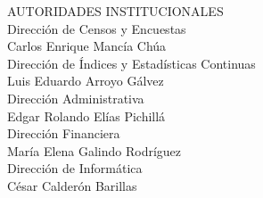 \clearpage

$\ $
\vspace{1cm}

\begin{center}
{\Bold \LARGE AUTORIDADES INSTITUCIONALES}\\[2cm]

{\Bold \large \color{color1!89!black} Dirección de Censos y Encuestas}\\[0.2cm]
Carlos Enrique Mancía Chúa\\[0.8cm]


{\Bold \large \color{color1!89!black} Dirección de Índices y Estadísticas Continuas}\\[0.2cm]
Luis Eduardo Arroyo Gálvez\\[0.8cm]

{\Bold \large \color{color1!89!black} Dirección Administrativa}\\[0.2cm]
Edgar Rolando Elías Pichillá\\[0.8cm]

{\Bold \large \color{color1!89!black} Dirección Financiera}\\[0.2cm]
María Elena Galindo Rodríguez\\[0.8cm]


{\Bold \large \color{color1!89!black} Dirección de Informática}\\[0.2cm]
César Calderón Barillas\\[0.8cm]


\end{center}\setcounter{page}{0}\cleardoublepage

\clearpage

$\ $
\vspace{1cm}

